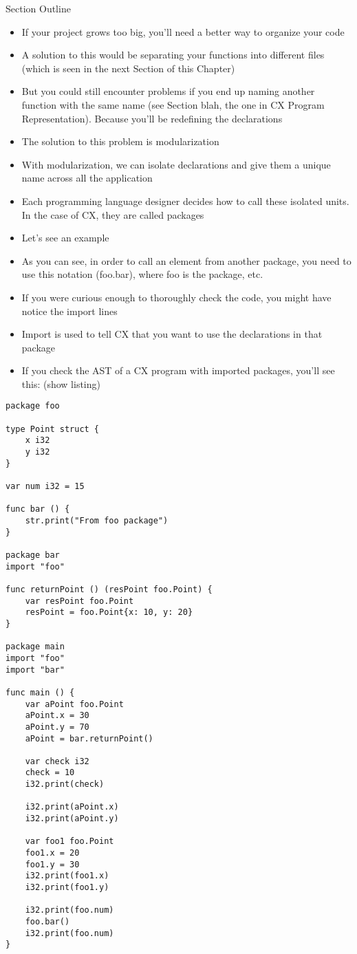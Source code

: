 \documentclass[11pt,fleqn,openany]{book} %
\begin{document}
\begin{remark}
Section Outline
    \begin{itemize}
    	\item If your project grows too big, you'll need a better way to organize your code
        \item A solution to this would be separating your functions into different files (which is seen in the next Section of this Chapter)
        \item But you could still encounter problems if you end up naming another function with the same name (see Section blah, the one in CX Program Representation). Because you'll be redefining the declarations
        \item The solution to this problem is modularization
        \item With modularization, we can isolate declarations and give them a unique name across all the application
        \item Each programming language designer decides how to call these isolated units. In the case of CX, they are called packages
        \item Let's see an example
        \item As you can see, in order to call an element from another package, you need to use this notation (foo.bar), where foo is the package, etc.
        \item If you were curious enough to thoroughly check the code, you might have notice the import lines
        \item Import is used to tell CX that you want to use the declarations in that package
        \item If you check the AST of a CX program with imported packages, you'll see this: (show listing)
    \end{itemize}
\end{remark}

\begin{lstlisting}[caption={Importing Packages Example},captionpos=b,label={listing:packages-example}]
package foo

type Point struct {
	x i32
	y i32
}

var num i32 = 15

func bar () {
	str.print("From foo package")
}

package bar
import "foo"

func returnPoint () (resPoint foo.Point) {
	var resPoint foo.Point
	resPoint = foo.Point{x: 10, y: 20}
}

package main
import "foo"
import "bar"

func main () {
	var aPoint foo.Point
	aPoint.x = 30
	aPoint.y = 70
	aPoint = bar.returnPoint()

	var check i32
	check = 10
	i32.print(check)
	
	i32.print(aPoint.x)
	i32.print(aPoint.y)

	var foo1 foo.Point
	foo1.x = 20
	foo1.y = 30
	i32.print(foo1.x)
	i32.print(foo1.y)
	
	i32.print(foo.num)
	foo.bar()
	i32.print(foo.num)
}
\end{lstlisting}
\end{document}
